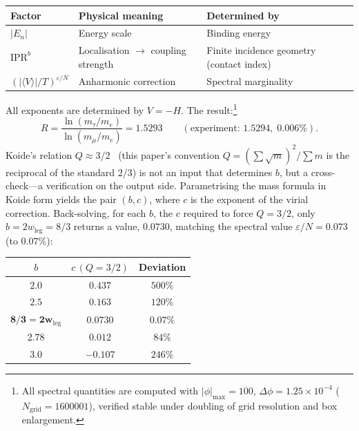 \documentclass[12pt,a4paper]{article}
\begin{document}
\begin{center}\small\setlength{\tabcolsep}{5pt}
\begin{tabular}{lll}
\toprule
Factor & Physical meaning & Determined by \\
\midrule
$|E_n|$ & Energy scale & Binding energy \\
$\mathrm{IPR}^{b}$ & Localisation $\to$ coupling strength & Finite incidence geometry (contact index) \\
$(|\langle V \rangle|/T)^{\varepsilon/N}$ & Anharmonic correction & Spectral marginality \\
\bottomrule
\end{tabular}
\end{center}

\noindent
All exponents are determined by $V = -H$.
The result:\footnote{All spectral quantities are computed with
$|\phi|_\mathrm{max} = 100$, $\Delta\phi = 1.25\times 10^{-4}$
($N_\mathrm{grid} = 1600001$), verified stable under
doubling of grid resolution and box enlargement.}
\begin{equation}
  R = \frac{\ln(m_\tau/m_e)}{\ln(m_\mu/m_e)} = 1.5293
  \qquad (\text{experiment: } 1.5294,\; 0.006\%).
\end{equation}
Koide's relation $Q \approx 3/2$~\cite{koide} (this paper's convention $Q = (\sum\sqrt{m})^2/\sum m$ is the reciprocal of the standard $2/3$) is not an input that determines $b$, but a cross-check---a verification on the output side. Parametrising the mass formula in Koide form yields the pair $(b, c)$, where $c$ is the exponent of the virial correction. Back-solving, for each $b$, the $c$ required to force $Q = 3/2$, only $b = 2w_\mathrm{leg} = 8/3$ returns a value, $0.0730$, matching the spectral value $\varepsilon/N = 0.073$ (to $0.07\%$):
  \begin{center}\small
  \begin{tabular}{ccc}
  \toprule
  $b$ & $c\,(Q{=}3/2)$ & Deviation \\
  \midrule
  $2.0$ & $0.437$ & $500\%$ \\
  $2.5$ & $0.163$ & $120\%$ \\
  $\mathbf{8/3 = 2w_\mathrm{leg}}$ & $\mathbf{0.0730}$ & $\mathbf{0.07\%}$ \\
  $2.78$ & $0.012$ & $84\%$ \\
  $3.0$ & $-0.107$ & $246\%$ \\
  \bottomrule
  \end{tabular}
  \end{center}
\end{document}
